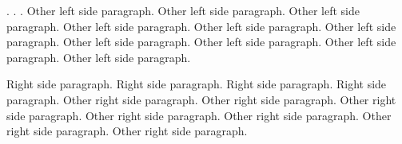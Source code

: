 \documentclass{article}
\begin{document}
\makeatletter

\makeatother

\begin{pages}
    \begin{Leftside}
        \beginnumbering
            \pstart
                 . . .
            \pend
            \pstart
                Other left side paragraph.  Other left side paragraph.  Other left side paragraph.  Other left side paragraph.  Other left side paragraph.  Other left side paragraph.  Other left side paragraph.  Other left side paragraph.  Other left side paragraph.  Other left side paragraph.
            \pend
        \endnumbering
    \end{Leftside}
    \begin{Rightside}
        \beginnumbering
            \pstart
                 Right side paragraph. Right side paragraph. Right side paragraph. Right side paragraph.
            \pend
            \pstart
                Other right side paragraph. Other right side paragraph. Other right side paragraph. Other right side paragraph. Other right side paragraph. Other right side paragraph. Other right side paragraph.
            \pend
        \endnumbering
    \end{Rightside}

\end{pages} 
\Pages
\end{document}

